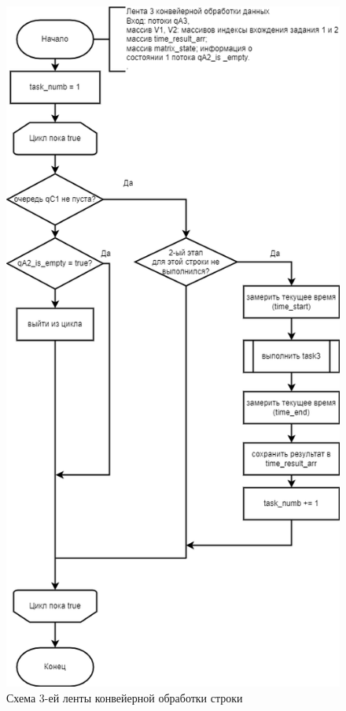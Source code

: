 \clearpage

\begin{figure}[h]
	\centering
	\includegraphics[scale=0.5]{img/parallel_stage_3.png}
	\caption{Схема 3-ей ленты конвейерной обработки строки}
	\label{fig:parallel_stage_3}
\end{figure} 

